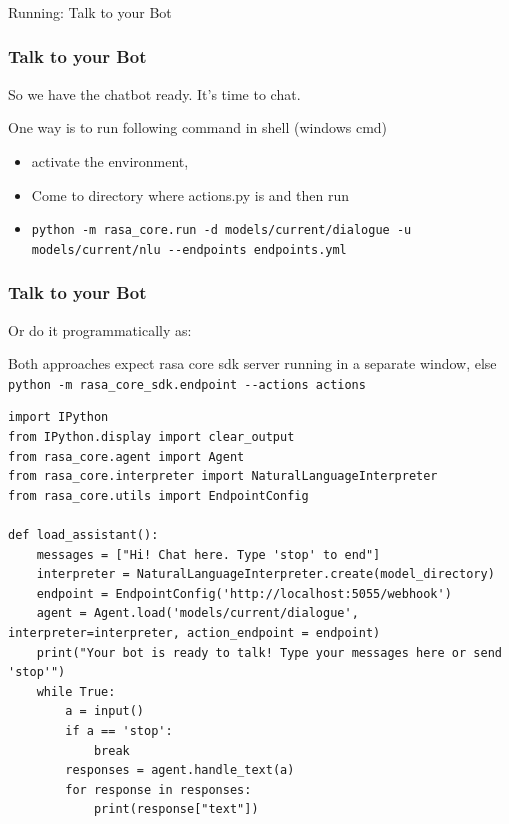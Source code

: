 \begin{frame}[fragile]\frametitle{}
\begin{center}
{\Large Running: Talk to your Bot}

\end{center}
\end{frame}



 \begin{frame}[fragile]\frametitle{Talk to your Bot}

So we have the chatbot ready. It’s time to chat.

One way is to run following command in shell (windows cmd) 
\begin{itemize}
\item activate the environment,
\item Come to directory where actions.py is and then run
\item \lstinline|python -m rasa_core.run -d models/current/dialogue -u models/current/nlu --endpoints endpoints.yml|
\end{itemize}

\end{frame}

 \begin{frame}[fragile]\frametitle{Talk to your Bot}

Or do it programmatically as:

Both approaches expect rasa core sdk server running in a separate window, else 
\lstinline|python -m rasa_core_sdk.endpoint --actions actions|


\begin{lstlisting}
import IPython
from IPython.display import clear_output
from rasa_core.agent import Agent
from rasa_core.interpreter import NaturalLanguageInterpreter
from rasa_core.utils import EndpointConfig

def load_assistant():
    messages = ["Hi! Chat here. Type 'stop' to end"]
    interpreter = NaturalLanguageInterpreter.create(model_directory)
    endpoint = EndpointConfig('http://localhost:5055/webhook')
    agent = Agent.load('models/current/dialogue', interpreter=interpreter, action_endpoint = endpoint)
    print("Your bot is ready to talk! Type your messages here or send 'stop'")
    while True:
        a = input()
        if a == 'stop':
            break
        responses = agent.handle_text(a)
        for response in responses:
            print(response["text"])
\end{lstlisting}

\end{frame}

